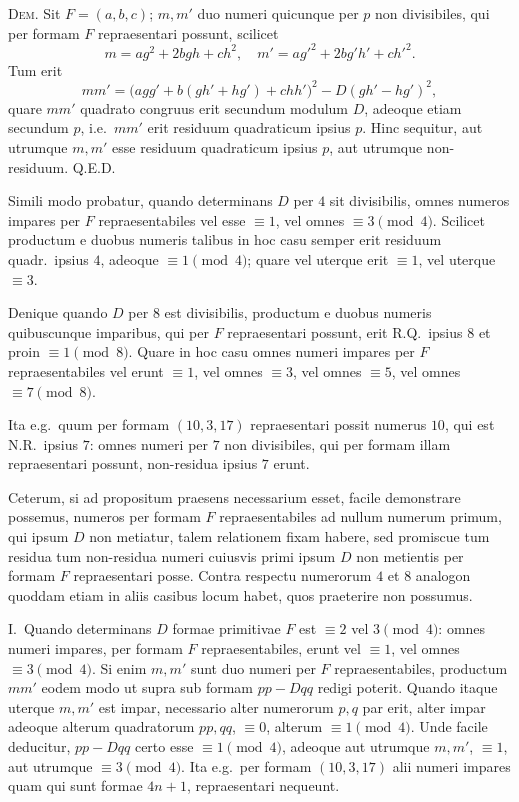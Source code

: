 \documentclass[12pt,a4paper]{article}
\theoremstyle{plain}
\theoremstyle{definition}
\theoremstyle{remark}
\begin{document}
\textsc{Dem.} Sit $F=(a,b,c)$; $m,m'$ duo numeri quicunque per $p$ non divisibiles, qui per formam $F$ repraesentari possunt, scilicet
\[
m=ag^2+2bgh+ch^2,\quad m'=ag'^2+2bg'h'+ch'^2.
\]
Tum erit
\[
mm'=\bigl(agg'+b(gh'+hg')+chh'\bigr)^2-D(gh'-hg')^2,
\]
quare $mm'$ quadrato congruus erit secundum modulum $D$, adeoque etiam secundum $p$, i.e.\ $mm'$ erit residuum quadraticum ipsius $p$. Hinc sequitur, aut utrumque $m,m'$ esse residuum quadraticum ipsius $p$, aut utrumque non-residuum. Q.E.D.

Simili modo probatur, quando determinans $D$ per $4$ sit divisibilis, omnes numeros impares per $F$ repraesentabiles vel esse $\equiv1$, vel omnes $\equiv3\pmod4$. Scilicet productum e duobus numeris talibus in hoc casu semper erit residuum quadr.\ ipsius $4$, adeoque $\equiv1\pmod4$; quare vel uterque erit $\equiv1$, vel uterque $\equiv3$.

Denique quando $D$ per $8$ est divisibilis, productum e duobus numeris quibuscunque imparibus, qui per $F$ repraesentari possunt, erit R.Q.\ ipsius $8$ et proin $\equiv1\pmod8$. Quare in hoc casu omnes numeri impares per $F$ repraesentabiles vel erunt $\equiv1$, vel omnes $\equiv3$, vel omnes $\equiv5$, vel omnes $\equiv7\pmod8$.

Ita e.g.\ quum per formam $(10,3,17)$ repraesentari possit numerus $10$, qui est N.R.\ ipsius $7$: omnes numeri per $7$ non divisibiles, qui per formam illam repraesentari possunt, non-residua ipsius $7$ erunt.

Ceterum, si ad propositum praesens necessarium esset, facile demonstrare possemus, numeros per formam $F$ repraesentabiles ad nullum numerum primum, qui ipsum $D$ non metiatur, talem relationem fixam habere, sed promiscue tum residua tum non-residua numeri cuiusvis primi ipsum $D$ non metientis per formam $F$ repraesentari posse. Contra respectu numerorum $4$ et $8$ analogon quoddam etiam in aliis casibus locum habet, quos praeterire non possumus.

I.\ Quando determinans $D$ formae primitivae $F$ est $\equiv2$ vel $3\pmod4$: omnes numeri impares, per formam $F$ repraesentabiles, erunt vel $\equiv1$, vel omnes $\equiv3\pmod4$. Si enim $m,m'$ sunt duo numeri per $F$ repraesentabiles, productum $mm'$ eodem modo ut supra sub formam $pp-Dqq$ redigi poterit. Quando itaque uterque $m,m'$ est impar, necessario alter numerorum $p,q$ par erit, alter impar adeoque alterum quadratorum $pp,qq$, $\equiv0$, alterum $\equiv1\pmod4$. Unde facile deducitur, $pp-Dqq$ certo esse $\equiv1\pmod4$, adeoque aut utrumque $m,m'$, $\equiv1$, aut utrumque $\equiv3\pmod4$. Ita e.g.\ per formam $(10,3,17)$ alii numeri impares quam qui sunt formae $4n+1$, repraesentari nequeunt.
\end{document}
